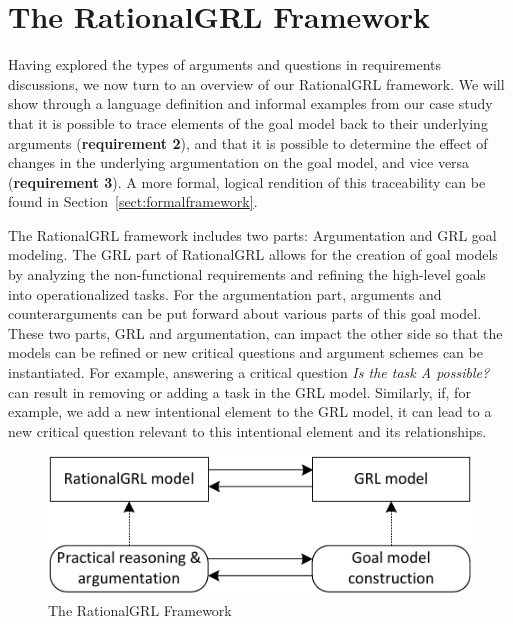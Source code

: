 \section{The RationalGRL Framework}
\label{sect:overview}

Having explored the types of arguments and questions in requirements discussions, we now turn to an overview of our RationalGRL framework. We will show through a language definition and informal examples from our case study that it is possible to trace elements of the goal model back to their underlying arguments (\textbf{requirement 2}), and that it is possible to determine the effect of changes in the underlying argumentation on the goal model, and vice versa (\textbf{requirement 3}). A more formal, logical rendition of this traceability can be found in Section~\ref{sect:formalframework}.

The RationalGRL framework includes two parts: Argumentation and GRL goal modeling. The GRL part of RationalGRL allows for the creation of goal models by analyzing the non-functional requirements and refining the high-level goals into operationalized tasks. For the argumentation part, arguments and counterarguments can be put forward about various parts of this goal model. These two parts, GRL and argumentation, can impact the other side so that the models can be refined or new critical questions and argument schemes can be instantiated. For example, answering a critical question \emph{Is the task \emph{A} possible?} can result in removing or adding a task in the GRL model. Similarly,  if, for example, we add a new intentional element to the GRL model, it can lead to a new critical question relevant to this intentional element and its relationships.  

\begin{figure}[b]
\centering
\includegraphics[width=\columnwidth]{img/framework.pdf}
\caption{The RationalGRL Framework}
\label{fig:rationalgrl-framework}
\end{figure}

